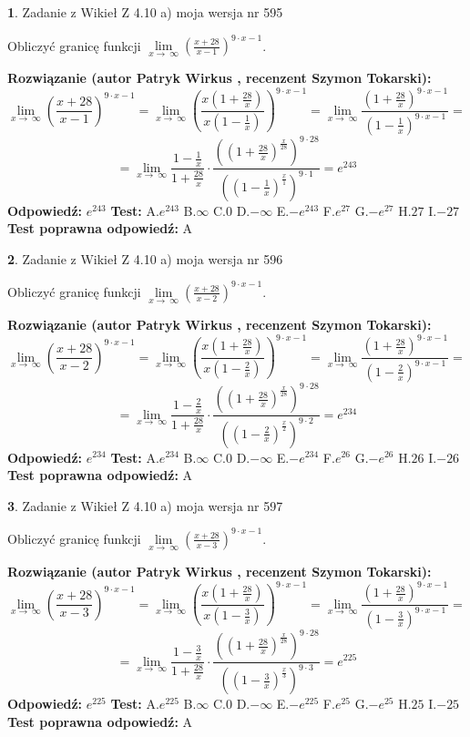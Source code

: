 \documentclass[12pt, a4paper]{article}
\theoremstyle{definition} %
\newtheorem{zad}{}
\newcommand{\zadStart}[1]{\begin{zad}#1\newline}
\newcommand{\zadStop}{\end{zad}}
\newcommand{\rozwStart}[2]{\noindent \textbf{Rozwiązanie (autor #1 , recenzent #2): }\newline}
\newcommand{\rozwStop}{\newline}
\newcommand{\odpStart}{\noindent \textbf{Odpowiedź:}\newline}
\newcommand{\odpStop}{\newline}
\newcommand{\testStart}{\noindent \textbf{Test:}\newline}
\newcommand{\testStop}{\newline}
\newcommand{\kluczStart}{\noindent \textbf{Test poprawna odpowiedź:}\newline}
\newcommand{\kluczStop}{\newline}
\begin{document}
\zadStart{Zadanie z Wikieł Z 4.10 a) moja wersja nr 595}

Obliczyć granicę funkcji  $\lim\limits_{x\to\ \infty}(\frac{x+28}{x-1})^{9\cdot x-1}$.
\zadStop
\rozwStart{Patryk Wirkus}{Szymon Tokarski}
$$\lim\limits_{x\to\ \infty}(\frac{x+28}{x-1})^{9\cdot x-1} = \lim\limits_{x\to\ \infty}(\frac{x(1+\frac{28}{x})}{x(1-\frac{1}{x})})^{9\cdot x-1}=\lim\limits_{x\to\ \infty}\frac{(1+\frac{28}{x})^{9\cdot x-1}}{(1-\frac{1}{x})^{9\cdot x-1}}=$$
$$=\lim\limits_{x\to\ \infty}\frac{1-\frac{1}{x}}{1+\frac{28}{x}}\cdot\frac{((1+\frac{28}{x})^{\frac{x}{28}})^{9\cdot28}}{((1-\frac{1}{x})^{\frac{x}{1}})^{9\cdot1}}=e^{243}$$
\rozwStop
\odpStart
$e^{243}$
\odpStop
\testStart
A.$e^{243}$ B.$\infty$ C.$0$ D.$-\infty$ E.$-e^{243}$
F.$e^{27}$ G.$-e^{27}$
H.$27$
I.$-27$
\testStop
\kluczStart
A
\kluczStop



\zadStart{Zadanie z Wikieł Z 4.10 a) moja wersja nr 596}

Obliczyć granicę funkcji  $\lim\limits_{x\to\ \infty}(\frac{x+28}{x-2})^{9\cdot x-1}$.
\zadStop
\rozwStart{Patryk Wirkus}{Szymon Tokarski}
$$\lim\limits_{x\to\ \infty}(\frac{x+28}{x-2})^{9\cdot x-1} = \lim\limits_{x\to\ \infty}(\frac{x(1+\frac{28}{x})}{x(1-\frac{2}{x})})^{9\cdot x-1}=\lim\limits_{x\to\ \infty}\frac{(1+\frac{28}{x})^{9\cdot x-1}}{(1-\frac{2}{x})^{9\cdot x-1}}=$$
$$=\lim\limits_{x\to\ \infty}\frac{1-\frac{2}{x}}{1+\frac{28}{x}}\cdot\frac{((1+\frac{28}{x})^{\frac{x}{28}})^{9\cdot28}}{((1-\frac{2}{x})^{\frac{x}{2}})^{9\cdot2}}=e^{234}$$
\rozwStop
\odpStart
$e^{234}$
\odpStop
\testStart
A.$e^{234}$ B.$\infty$ C.$0$ D.$-\infty$ E.$-e^{234}$
F.$e^{26}$ G.$-e^{26}$
H.$26$
I.$-26$
\testStop
\kluczStart
A
\kluczStop



\zadStart{Zadanie z Wikieł Z 4.10 a) moja wersja nr 597}

Obliczyć granicę funkcji  $\lim\limits_{x\to\ \infty}(\frac{x+28}{x-3})^{9\cdot x-1}$.
\zadStop
\rozwStart{Patryk Wirkus}{Szymon Tokarski}
$$\lim\limits_{x\to\ \infty}(\frac{x+28}{x-3})^{9\cdot x-1} = \lim\limits_{x\to\ \infty}(\frac{x(1+\frac{28}{x})}{x(1-\frac{3}{x})})^{9\cdot x-1}=\lim\limits_{x\to\ \infty}\frac{(1+\frac{28}{x})^{9\cdot x-1}}{(1-\frac{3}{x})^{9\cdot x-1}}=$$
$$=\lim\limits_{x\to\ \infty}\frac{1-\frac{3}{x}}{1+\frac{28}{x}}\cdot\frac{((1+\frac{28}{x})^{\frac{x}{28}})^{9\cdot28}}{((1-\frac{3}{x})^{\frac{x}{3}})^{9\cdot3}}=e^{225}$$
\rozwStop
\odpStart
$e^{225}$
\odpStop
\testStart
A.$e^{225}$ B.$\infty$ C.$0$ D.$-\infty$ E.$-e^{225}$
F.$e^{25}$ G.$-e^{25}$
H.$25$
I.$-25$
\testStop
\kluczStart
A
\kluczStop
\end{document}
